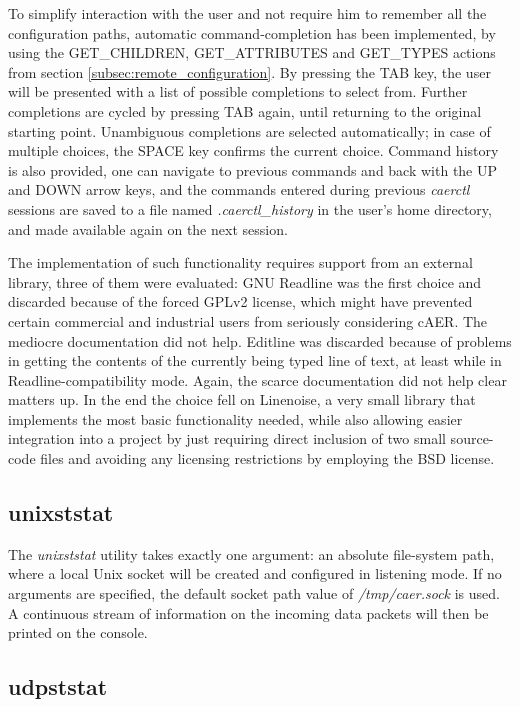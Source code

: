 \documentclass[a4paper,12pt]{report}
\begin{document}
To simplify interaction with the user and not require him to remember all the configuration paths, automatic command-completion has been implemented, by using the GET\_CHILDREN, GET\_ATTRIBUTES and GET\_TYPES actions from section \ref{subsec:remote_configuration}.
By pressing the TAB key, the user will be presented with a list of possible completions to select from. Further completions are cycled by pressing TAB again, until returning to the original starting point. Unambiguous completions are selected automatically; in case of multiple choices, the SPACE key confirms the current choice.
Command history is also provided, one can navigate to previous commands and back with the UP and DOWN arrow keys, and the commands entered during previous \emph{caerctl} sessions are saved to a file named \emph{.caerctl\_history} in the user's home directory, and made available again on the next session.

The implementation of such functionality requires support from an external library, three of them were evaluated: GNU Readline was the first choice and discarded because of the forced GPLv2 license, which might have prevented certain commercial and industrial users from seriously considering cAER. The mediocre documentation did not help. Editline was discarded because of problems in getting the contents of the currently being typed line of text, at least while in Readline-compatibility mode. Again, the scarce documentation did not help clear matters up.
In the end the choice fell on Linenoise, a very small library that implements the most basic functionality needed, while also allowing easier integration into a project by just requiring direct inclusion of two small source-code files and avoiding any licensing restrictions by employing the BSD license.

\subsection{unixststat} \label{subsec:unixststat}

The \emph{unixststat} utility takes exactly one argument: an absolute file-system path, where a local Unix socket will be created and configured in listening mode.
If no arguments are specified, the default socket path value of \emph{/tmp/caer.sock} is used.
A continuous stream of information on the incoming data packets will then be printed on the console.

\subsection{udpststat} \label{subsec:udpststat}
\end{document}
